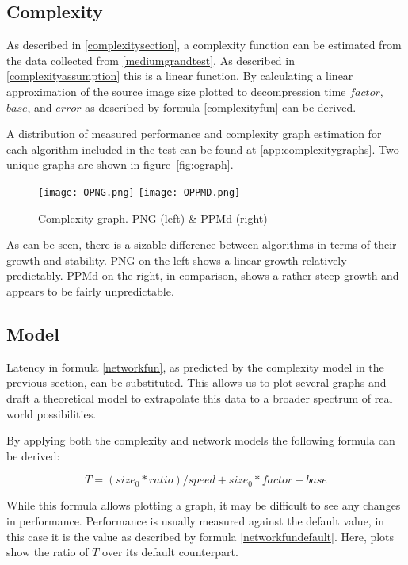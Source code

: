 \documentclass[11pt,a4paper]{report}
\begin{document}
\subsection{Complexity}

As described in \ref{complexitysection}, a complexity function can be estimated from the data collected from \ref{mediumgrandtest}. As described in \ref{complexityassumption} this is a linear function. By calculating a linear approximation of the source image size plotted to decompression time $factor$, $base$, and $error$ as described by formula \ref{complexityfun} can be derived.

A distribution of measured performance and complexity graph estimation for each algorithm included in the test can be found at \ref{app:complexitygraphs}. Two unique graphs are shown in figure~\ref{fig:ograph}.

\begin{figure}[h!]
\centering
\texttt{[image: OPNG.png]}
\texttt{[image: OPPMD.png]}
\caption{\label{fig:oPlot}Complexity graph. PNG (left) \& PPMd (right)}
\end{figure}

As can be seen, there is a sizable difference between algorithms in terms of their growth and stability. PNG on the left shows a linear growth relatively predictably. PPMd on the right, in comparison, shows a rather steep growth and appears to be fairly unpredictable. 

\subsection{Model}

Latency in formula \ref{networkfun}, as predicted by the complexity model in the previous section, can be substituted. This allows us to plot several graphs and draft a theoretical model to extrapolate this data to a broader spectrum of real world possibilities.

By applying both the complexity and network models the following formula can be derived:

\begin{equation}
T = (size_0 * ratio) / speed + size_0 * factor + base
\end{equation}

While this formula allows plotting a graph, it may be difficult to see any changes in performance. Performance is usually measured against the default value, in this case it is the value as described by formula \ref{networkfundefault}. Here, plots show the ratio of $T$ over its default counterpart.
\end{document}

